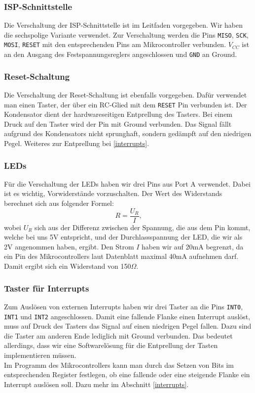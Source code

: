 \documentclass[]{article}
\begin{document}
\subsubsection{ISP-Schnittstelle}
Die Verschaltung der ISP-Schnittstelle ist im Leitfaden vorgegeben. Wir haben die sechspolige Variante verwendet. Zur Verschaltung werden die Pins \texttt{MISO}, \texttt{SCK}, \texttt{MOSI}, \texttt{RESET} mit den entsprechenden Pins am Mikrocontroller verbunden. \texttt{$V_{CC}$} ist an den Ausgang des Festspannungsreglers angeschlossen und \texttt{GND} an Ground.

\subsubsection{Reset-Schaltung}
Die Verschaltung der Reset-Schaltung ist ebenfalls vorgegeben. Dafür verwendet man einen Taster, der über ein RC-Glied mit dem \texttt{RESET} Pin verbunden ist. Der Kondensator dient der hardwareseitigen Entprellung des Tasters. Bei einem Druck auf den Taster wird der Pin mit Ground verbunden. Das Signal fällt aufgrund des Kondensators nicht sprunghaft, sondern gedämpft auf den niedrigen Pegel. Weiteres zur Entprellung bei \ref{interrupts}.

\subsubsection{LEDs}
Für die Verschaltung der LEDs haben wir drei Pins aus Port A verwendet. Dabei ist es wichtig, Vorwiderstände vorzuschalten. Der Wert des Widerstands berechnet sich aus folgender Formel:
\begin{equation*}
R = \frac{U_R}{I}\text{,}
\end{equation*}
wobei $U_R$ sich aus der Differenz zwischen der Spannung, die aus dem Pin kommt, welche bei uns 5V entspricht, und der Durchlassspannung der LED, die wir als 2V angenommen haben, ergibt. Den Strom $I$ haben wir auf 20mA begrenzt, da ein Pin des Mikrocontrollers laut Datenblatt maximal 40mA aufnehmen darf. Damit ergibt sich ein Widerstand von 150$\Omega$.

\subsubsection{Taster für Interrupts}
Zum Auslösen von externen Interrupts haben wir drei Taster an die Pins \texttt{INT0}, \texttt{INT1} und \texttt{INT2} angeschlossen. Damit eine fallende Flanke einen Interrupt auslöst, muss auf Druck des Tasters das Signal auf einen niedrigen Pegel fallen. Dazu sind die Taster am anderen Ende lediglich mit Ground verbunden. Das bedeutet allerdings, dass wir eine Softwarelösung für die Entprellung der Tasten implementieren müssen.
\\Im Programm des Mikrocontrollers kann man durch das Setzen von Bits im entsprechenden Register festlegen, ob eine fallende oder eine steigende Flanke ein Interrupt auslösen soll. Dazu mehr im Abschnitt \ref{interrupts}.
\end{document}
